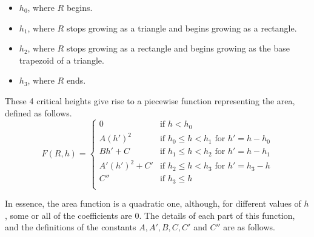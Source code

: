 \begin{itemize}
\item $h_0$, where $R$ begins.
\item $h_1$, where $R$ stops growing as a triangle and begins growing as a 
rectangle.
\item $h_2$, where $R$ stops growing as a rectangle and begins growing as the 
base trapezoid of a triangle.
\item $h_3$, where $R$ ends.
\end{itemize}

These 4 critical heights give rise to a piecewise function representing the 
area, defined as follows.
\[
F(R, h) = \begin{cases}
0                  & \text{if }          h < h_0 \\
A(h')^2            & \text{if } h_0 \leq h < h_1 \text{ for } h' = h - h_0 \\
Bh' + C            & \text{if } h_1 \leq h < h_2 \text{ for } h' = h - h_1 \\
A'(h')^2 + C'      & \text{if } h_2 \leq h < h_3 \text{ for } h' = h_3 - h \\
C''                & \text{if } h_3 \leq h \\
\end{cases}
\]


In essence, the area function is a quadratic one, although, for different values 
of $h$, some or all of the coefficients are 0. The details of each part of this 
function, and the definitions of the constants $A, A', B, C, C'$ and $C''$ are 
as follows.

